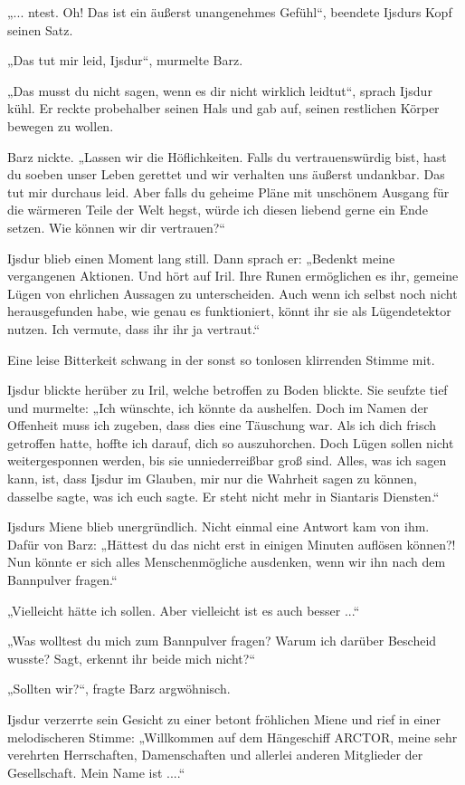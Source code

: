 „... ntest. Oh! Das ist ein äußerst unangenehmes Gefühl“, beendete Ijsdurs Kopf seinen Satz.

„Das tut mir leid, Ijsdur“, murmelte Barz.

„Das musst du nicht sagen, wenn es dir nicht wirklich leidtut“, sprach Ijsdur kühl. Er reckte probehalber seinen Hals und gab auf, seinen restlichen Körper bewegen zu wollen.

Barz nickte. „Lassen wir die Höflichkeiten. Falls du vertrauenswürdig bist, hast du soeben unser Leben gerettet und wir verhalten uns äußerst undankbar. Das tut mir durchaus leid. Aber falls du geheime Pläne mit unschönem Ausgang für die wärmeren Teile der Welt hegst, würde ich diesen liebend gerne ein Ende setzen. Wie können wir dir vertrauen?“

Ijsdur blieb einen Moment lang still. Dann sprach er: „Bedenkt meine vergangenen Aktionen. Und hört auf Iril. Ihre Runen ermöglichen es ihr, gemeine Lügen von ehrlichen Aussagen zu unterscheiden. Auch wenn ich selbst noch nicht herausgefunden habe, wie genau es funktioniert, könnt ihr sie als Lügendetektor nutzen. Ich vermute, dass ihr ihr ja vertraut.“

Eine leise Bitterkeit schwang in der sonst so tonlosen klirrenden Stimme mit.

Ijsdur blickte herüber zu Iril, welche betroffen zu Boden blickte. Sie seufzte tief und murmelte: „Ich wünschte, ich könnte da aushelfen. Doch im Namen der Offenheit muss ich zugeben, dass dies eine Täuschung war. Als ich dich frisch getroffen hatte, hoffte ich darauf, dich so auszuhorchen. Doch Lügen sollen nicht weitergesponnen werden, bis sie unniederreißbar groß sind. Alles, was ich sagen kann, ist, dass Ijsdur im Glauben, mir nur die Wahrheit sagen zu können, dasselbe sagte, was ich euch sagte. Er steht nicht mehr in Siantaris Diensten.“

Ijsdurs Miene blieb unergründlich. Nicht einmal eine Antwort kam von ihm. Dafür von Barz: „Hättest du das nicht erst in einigen Minuten auflösen können?! Nun könnte er sich alles Menschenmögliche ausdenken, wenn wir ihn nach dem Bannpulver fragen.“

„Vielleicht hätte ich sollen. Aber vielleicht ist es auch besser ...“

„Was wolltest du mich zum Bannpulver fragen? Warum ich darüber Bescheid wusste? Sagt, erkennt ihr beide mich nicht?“

„Sollten wir?“, fragte Barz argwöhnisch.

Ijsdur verzerrte sein Gesicht zu einer betont fröhlichen Miene und rief in einer melodischeren Stimme: „Willkommen auf dem Hängeschiff ARCTOR, meine sehr verehrten Herrschaften, Damenschaften und allerlei anderen Mitglieder der Gesellschaft. Mein Name ist ....“

